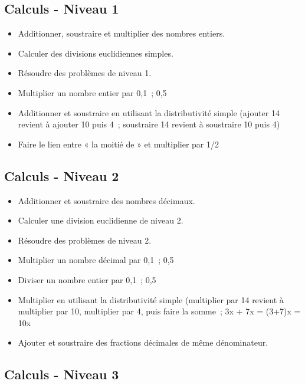 \documentclass[a4paper,12pt,fleqn]{article}	
\begin{document}
\renewcommand{\labelitemi}{}

\subsection*{Calculs - Niveau 1}

\begin{itemize}
	\item {}Additionner, soustraire et multiplier des nombres entiers.
	\item {}Calculer des divisions euclidiennes simples.
	\item {}Résoudre des problèmes de niveau 1.
	\item {}Multiplier un nombre entier par 0,1 ; 0,5
	\item {}Additionner et soustraire en utilisant la distributivité simple (ajouter 14 revient à ajouter 10 puis 4 ; soustraire 14 revient à soustraire 10 puis 4)
	\item {}Faire le lien entre « la moitié de » et multiplier par 1/2

\end{itemize}

\subsection*{Calculs - Niveau 2}

\begin{itemize}
	\item {}Additionner et soustraire des nombres décimaux.
	\item {}Calculer une division euclidienne de niveau 2.
	\item {}Résoudre des problèmes de niveau 2.
	\item {}Multiplier un nombre décimal par 0,1 ; 0,5
	\item {}Diviser un nombre entier par 0,1 ; 0,5
	\item {}Multiplier en utilisant la distributivité simple (multiplier par 14 revient à multiplier par 10, multiplier par 4, puis faire la somme ; 3x + 7x = (3+7)x = 10x
	\item {}Ajouter et soustraire des fractions décimales de même dénominateur.

\end{itemize}

\subsection*{Calculs - Niveau 3}
\end{document}
